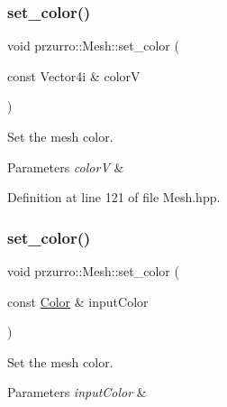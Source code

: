 \mbox{\label{classprzurro_1_1_mesh_a18662164729447fde86564e53f34f8f9}} 
\subsubsection{\texorpdfstring{set\_color()}{set\_color()}\hspace{0.1cm}{\footnotesize\ttfamily [1/2]}}
{\footnotesize\ttfamily void przurro\+::\+Mesh\+::set\+\_\+color (\begin{DoxyParamCaption}\item[{const Vector4i \&}]{colorV }\end{DoxyParamCaption})\hspace{0.3cm}{\ttfamily [inline]}}



Set the mesh color. 


\begin{DoxyParams}{Parameters}
{\em colorV} & \\
\hline
\end{DoxyParams}


Definition at line 121 of file Mesh.\+hpp.

\mbox{\label{classprzurro_1_1_mesh_af4fdc058dd872fa968d5bd1c01737605}} 
\subsubsection{\texorpdfstring{set\_color()}{set\_color()}\hspace{0.1cm}{\footnotesize\ttfamily [2/2]}}
{\footnotesize\ttfamily void przurro\+::\+Mesh\+::set\+\_\+color (\begin{DoxyParamCaption}\item[{const \mbox{\hyperlink{structprzurro_1_1_color___buffer___rgba8888_1_1_color}{Color}} \&}]{input\+Color }\end{DoxyParamCaption})\hspace{0.3cm}{\ttfamily [inline]}}



Set the mesh color. 


\begin{DoxyParams}{Parameters}
{\em input\+Color} & \\
\hline
\end{DoxyParams}


